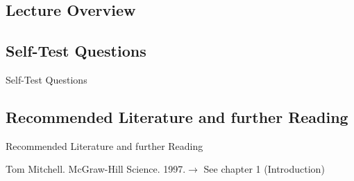\subsection{Lecture Overview}



\subsection{Self-Test Questions}

\begin{frame}{Self-Test Questions}{}

\end{frame}

\subsection{Recommended Literature and further Reading}

\begin{frame}{Recommended Literature and further Reading}{}
	\footnotesize
	\begin{thebibliography}{2}
			{Tom Mitchell. McGraw-Hill Science. 1997.}{$\rightarrow$ See chapter 1 (Introduction)}
	\end{thebibliography}
\end{frame}


\makethanks


%
%
%	


